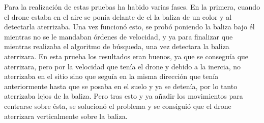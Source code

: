 \hspace{1cm} Para la realizaci\'on de estas pruebas ha habido varias fases. En la primera, cuando el drone estaba en el aire se pon\'ia delante de el la baliza de un color y al detectarla aterrizaba. Una vez funcion\'o esto, se prob\'o poniendo la baliza bajo \'el mientras no se le mandaban \'ordenes de velocidad, y ya para finalizar que mientras realizaba el algoritmo de b\'usqueda, una vez detectara la baliza aterrizara. En esta prueba los resultados eran buenos, ya que se consegu\'ia que aterrizara, pero por la velocidad que ten\'ia el drone y debido a la inercia, no aterrizaba en el sitio sino que segu\'ia en la misma direcci\'on que ten\'ia anteriormente hasta que se posaba en el suelo y ya se deten\'ia, por lo tanto aterrizaba lejos de la baliza. Pero tras esto y ya añadir los movimientos para centrarse sobre \'esta, se solucion\'o el problema y se consigui\'o que el drone aterrizara verticalmente sobre la baliza. 

